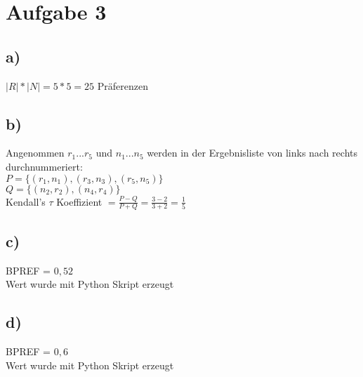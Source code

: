 \documentclass[11pt,a4paper,parskip=half ]{scrartcl}
\begin{document}
	
	\section*{Aufgabe 3}
	
	\subsection*{a)}
	 $|R|\ast|N|=5\ast5=25$ Präferenzen
	
	\subsection*{b)} Angenommen $r_1...r_5$ und $n_1...n_5$ werden in der Ergebnisliste von links nach rechts durchnummeriert:	\\
	$P = \{(r_1, n_1),(r_3, n_3),(r_5, n_5)\}$	\\
	$Q = \{(n_2, r_2),(n_4, r_4)\}$	\\
	Kendall's $\tau$ Koeffizient $= \frac{P-Q}{P+Q} = \frac{3-2}{3+2} = \frac{1}{5}$ 
	
	\subsection*{c)} 
	BPREF = $0,52$	\\
	Wert wurde mit Python Skript erzeugt
	
	\subsection*{d)}
	BPREF = $0,6$	\\
	Wert wurde mit Python Skript erzeugt
	
\end{document}
